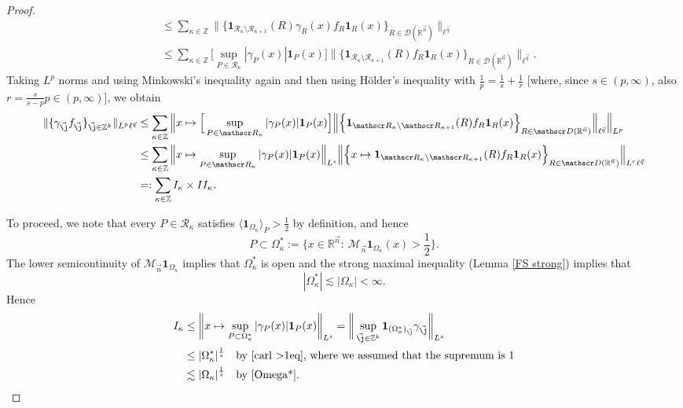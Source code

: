 \documentclass[10pt,a4paper]{amsart}
\newcommand{\BNorm}[2]{\Big\|#1\Big\|_{#2}}
\newcommand{\D}{\mathscr D}
\newcommand{\Norm}[2]{\|#1\|_{#2}}
\newcommand{\Rs}{\mathscr R}
\newcommand{\R}{\mathbb R}
\newcommand{\Z}{\mathbb Z}
\newcommand{\abs}[1]{|#1|}
\newcommand{\ave}[1]{\langle #1\rangle}
\newcommand{\one}{\mathbf{1}}
\newcommand{\vj}{\vec{\textit{\j}}}
\newcommand{\vn}{\vec n}
\newcommand{\vq}{\vec q}
\begin{document}
\begin{proof}
\begin{align*}
&\leq\sum_{\kappa\in\Z}\BNorm{\Big\{\one_{\Rs_\kappa\setminus\Rs_{\kappa+1}}(R)
\gamma_{R}(x)f_{R}\one_R(x)\Big\}_{R\in\D(\R^{\vn})}}{\ell^{\vq}} \\
&\leq\sum_{\kappa\in\Z}\Big[\sup_{P\in\Rs_\kappa}\abs{\gamma_P(x)}\one_P(x)\Big]
\BNorm{\Big\{\one_{\Rs_\kappa\setminus\Rs_{\kappa+1}}(R)f_{R}\one_R(x)
\Big\}_{R\in\D(\R^{\vn})}}{\ell^{\vq}}.
\end{align*}
Taking $L^p$ norms and using Minkowski's inequality again
and then using H\"older's inequality with $\frac1p=\frac1s+\frac1r$ [where, since $s\in(p,\infty)$, also $r=\frac{s}{s-p}p\in(p,\infty)$], we obtain
\begin{align*}
\Norm{\{\gamma_{\vj}f_{\vj}\}_{\vj\in\mathbb Z^k}}{L^p\ell^{\vq}}
&\leq \sum_{\kappa\in\Z}\Big\| x\mapsto \Big[\sup_{P\in\Rs_\kappa}\abs{\gamma_P(x)}\one_P(x)\Big]
\BNorm{\Big\{\one_{\Rs_\kappa\setminus\Rs_{\kappa+1}}(R)f_{R}\one_R(x)
\Big\}_{R\in\D(\R^{\vn})}}{\ell^{\vq}}\Big\|_{L^p}\\
&\leq\sum_{\kappa\in\Z}
\BNorm{x\mapsto\sup_{P\in\Rs_\kappa}\abs{\gamma_P(x)}\one_P(x)}{L^s}
\BNorm{\Big\{x\mapsto \one_{\Rs_\kappa\setminus\Rs_{\kappa+1}}(R)f_{R}\one_R(x)\Big\}_{R\in\D(\R^{\vn})}}{L^r\ell^{\vq}} \\
&=:\sum_{\kappa\in\Z}I_\kappa\times II_\kappa.
\end{align*}

To proceed, we note that every $P\in\Rs_\kappa$ satisfies $\ave{\one_{\Omega_\kappa}}_{P}>\frac12$ by definition, and hence
\begin{equation*}
P\subset\Omega_\kappa^*
:=\Big\{x\in\R^{\vn}:\ \mathcal M_{\vn}\one_{\Omega_\kappa}(x)>\frac12\Big\}.
\end{equation*}
The lower semicontinuity of $\mathcal M_{\vn}\one_{\Omega_\kappa}$ implies that $\Omega_\kappa^*$ is open
and the strong maximal inequality (Lemma \ref{FS strong}) implies that
\begin{equation}\label{Omega*}
\abs{\Omega_\kappa^*}\lesssim\abs{\Omega_\kappa}<\infty.
\end{equation}
Hence
\begin{equation*}
\begin{split}
I_\kappa
  &\leq\bigg\|x\mapsto\sup_{P\subset\Omega_\kappa^*}\abs{\gamma_P(x)}\one_P(x)\bigg\|_{L^s}
  =\bigg\|\sup_{\vj\in\mathbb Z^k}\one_{(\Omega_\kappa^*)_{\vj}} \gamma_{\vj}\bigg\|_{L^s} \\
  &\leq\abs{\Omega_\kappa^*}^{\frac 1s}\quad\text{by \eqref{carl >1eq}, where we assumed that the supremum is $1$} \\
  &\lesssim\abs{\Omega_\kappa}^{\frac 1s}\quad\text{by \eqref{Omega*}}.
\end{split}
\end{equation*}



\end{proof}
\end{document}
